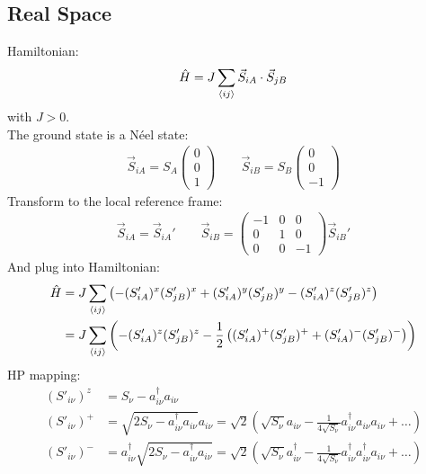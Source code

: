 \documentclass{article}
\begin{document}
\subsection{Real Space}
Hamiltonian:
\begin{align}
	\hat H = J \sum_{\braket{ij}} \vec S_{iA} \cdot \vec S_{jB}
\end{align}
with $J > 0$. \\
The ground state is a Néel state:
\begin{align}
	\vec S_{iA} = S_A \begin{pmatrix}
		0 \\ 0 \\ 1
	\end{pmatrix}
	\qquad
	\vec S_{iB} = S_B \begin{pmatrix}
	0 \\ 0 \\ -1
	\end{pmatrix}
\end{align}
Transform to the local reference frame:
\begin{align}
	\vec S_{iA} = \vec S_{iA}'
	\qquad
	\vec S_{iB} = \begin{pmatrix}
		-1 & 0 & 0 \\ 0 & 1 & 0 \\ 0 & 0 & -1
	\end{pmatrix} \vec S_{iB}'
\end{align}
And plug into Hamiltonian:
\begin{align}
	\hat H &= J \sum_{\braket{ij}} \left( -(S'_{iA})^x (S'_{jB})^x + (S'_{iA})^y (S'_{jB})^y - (S'_{iA})^z (S'_{jB})^z \right) \\
%
	&= J \sum_{\braket{ij}} \left( -(S'_{iA})^z (S'_{jB})^z - \frac{1}{2} \left( (S'_{iA})^+ (S'_{jB})^+ + (S'_{iA})^- (S'_{jB})^- \right) \right)
\end{align}
HP mapping:
\begin{align}
	(S'_{i\nu})^z &= S_\nu - a_{i\nu}^\dagger a_{i\nu} \\
	(S'_{i\nu})^+ &= \sqrt{2S_\nu - a_{i\nu}^\dagger a_{i\nu}} a_{i\nu} = \sqrt{2} \left(\sqrt{S_\nu} a_{i\nu} - \frac{1}{4\sqrt{S_\nu}} a_{i\nu}^\dagger a_{i\nu} a_{i\nu} + \dots \right) \\
	(S'_{i\nu})^- &= a_{i\nu}^\dagger \sqrt{2S_\nu - a_{i\nu}^\dagger a_{i\nu}} = \sqrt{2} \left(\sqrt{S_\nu} a^\dagger_{i\nu} - \frac{1}{4\sqrt{S_\nu}} a_{i\nu}^\dagger a^\dagger_{i\nu} a_{i\nu} + \dots \right) \\
\end{align}
\end{document}
